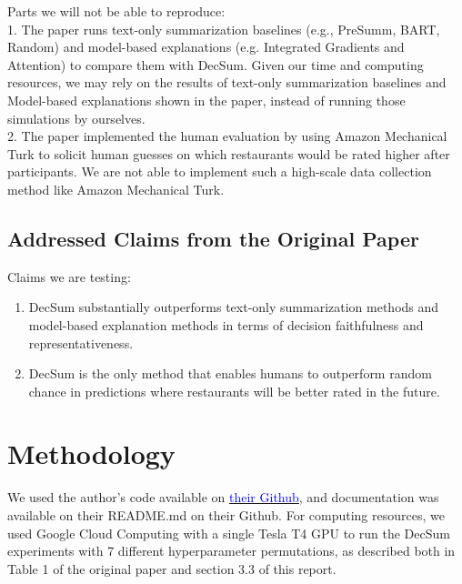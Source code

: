 \documentclass{article}
\newcommand{\blue}[1]{\textcolor{blue}{#1}}
\begin{document}
Parts we will not be able to reproduce: \\
1. The paper runs text-only summarization baselines (e.g., PreSumm, BART, Random) and model-based explanations (e.g. Integrated Gradients and Attention) to compare them with DecSum.
Given our time and computing resources, we may rely on the results of text-only summarization baselines and Model-based explanations shown in the paper, instead of running those simulations by ourselves. \\
2. The paper implemented the human evaluation by using Amazon Mechanical Turk to solicit human guesses on which restaurants would be rated higher after participants. We are not able to implement such
a high-scale data collection method like Amazon Mechanical Turk.

\subsection{Addressed Claims from the Original Paper}

Claims we are testing:
\begin{enumerate}
    \item DecSum substantially outperforms text-only summarization methods and model-based explanation methods in terms of decision faithfulness and representativeness.
    \item DecSum is the only method that enables humans to outperform random chance in predictions where restaurants will be better rated in the future.
\end{enumerate}


\section{Methodology}
We used the author’s code available on \href{https://github.com/ChicagoHAI/decsum}{\blue{their Github}}, and documentation was available on their README.md on their Github. For computing resources, we used
Google Cloud Computing with a single Tesla T4 GPU to run the DecSum experiments with 7 different hyperparameter permutations, as described both in Table 1 of the original paper and section
3.3 of this report.

\pagebreak
\end{document}
